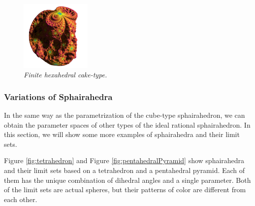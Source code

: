 \begin{figure}[htbp]
\begin{minipage}[t]{0.5\textwidth}
  \hspace*{\fill}
  \begin{minipage}[t]{0.24\textwidth}
   \centering
   \includegraphics[width=1.35in, height=1.35in, keepaspectratio]{./img/application/sphairahedron/variations/hexahedralCake2/finiteLimit.png}
  \end{minipage}
  \hspace*{\fill}
  \caption{\textit{Finite hexahedral cake-type.}}
  \label{fig:cake-limit-finite}
 \end{minipage}
\end{figure}

\subsubsection{Variations of Sphairahedra}

\noindent
In the same way as the parametrization of the cube-type sphairahedron, we
can obtain the parameter spaces of other types of the
ideal rational sphairahedron.
In this section, we will show some more examples of sphairahedra and
their limit sets.

Figure \ref{fig:tetrahedron} and Figure \ref{fig:pentahedralPyramid}
show sphairahedra and their limit sets based on a tetrahedron and
a pentahedral pyramid.
Each of them has the unique combination of dihedral angles and a single
parameter.
Both of the limit sets are actual spheres, but their patterns of color
are different from each other.

